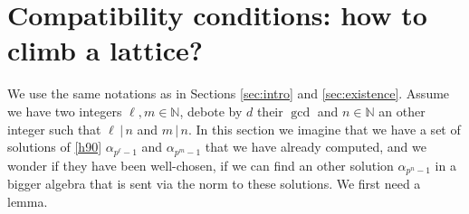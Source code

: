 \documentclass[a4paper,11pt]{article}
\begin{document}
\section{Compatibility conditions: how to climb a lattice?}
\label{sec:climb}

We use the same notations as in Sections \ref{sec:intro} and
\ref{sec:existence}. Assume we have two integers $\ell, m\in\mathbb{N}$,
debote by $d$ their $\gcd$ and $n\in\mathbb{N}$ an other integer such that
$\ell\,|\,n$ and $m\,|\,n$. In this section we imagine that we have a set of solutions of
\eqref{h90} $\alpha_{p^\ell-1}$ and $\alpha_{p^m-1}$ that we have already computed, and we wonder if they have been
well-chosen, \ie if we can find an other solution $\alpha_{p^n-1}$ in a bigger algebra that is
sent via the norm to these solutions. We first need a lemma.
\end{document}
